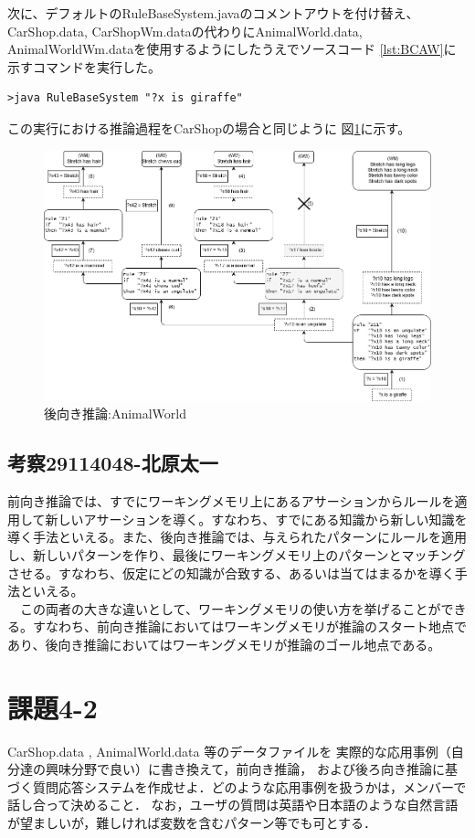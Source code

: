 \documentclass{jarticle}
\begin{document}
次に、デフォルトのRuleBaseSystem.javaのコメントアウトを付け替え、
CarShop.data, CarShopWm.dataの代わりにAnimalWorld.data, 
AnimalWorldWm.dataを使用するようにしたうえでソースコード
\ref{lst:BCAW}に示すコマンドを実行した。

\begin{lstlisting}[caption=後向き推論2,label=lst:BCAW]
>java RuleBaseSystem "?x is giraffe"
\end{lstlisting}

この実行における推論過程をCarShopの場合と同じように
図\ref{fig:BCAW}に示す。

\begin{figure}[htbp]
\includegraphics[scale=0.30]{048/Backward2.png}
\caption{後向き推論:AnimalWorld}
\label{fig:BCAW}
\end{figure}


\subsection{考察29114048-北原太一}

前向き推論では、すでにワーキングメモリ上にあるアサーションからルールを適用して新しいアサーションを導く。すなわち、すでにある知識から新しい知識を導く手法といえる。また、後向き推論では、与えられたパターンにルールを適用し、新しいパターンを作り、最後にワーキングメモリ上のパターンとマッチングさせる。すなわち、仮定にどの知識が合致する、あるいは当てはまるかを導く手法といえる。\\
　この両者の大きな違いとして、ワーキングメモリの使い方を挙げることができる。すなわち、前向き推論においてはワーキングメモリが推論のスタート地点であり、後向き推論においてはワーキングメモリが推論のゴール地点である。

\section{課題4-2}
\begin{screen}
    CarShop.data , AnimalWorld.data 等のデータファイルを
    実際的な応用事例（自分達の興味分野で良い）に書き換えて，前向き推論，
    および後ろ向き推論に基づく質問応答システムを作成せよ．どのような応用事例を扱うかは，メンバーで話し合って決めること．
    なお，ユーザの質問は英語や日本語のような自然言語が望ましいが，難しければ変数を含むパターン等でも可とする．
\end{screen}
\end{document}
